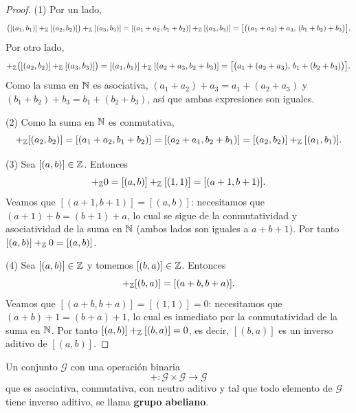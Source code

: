 \documentclass[12pt,a4paper]{book}
\begin{document}
    \begin{proof}
        (1) Por un lado,
        \begin{equation*}
            \big([(a_{1},b_{1})]+_{\mathbb{Z}}[(a_{2},b_{2})]\big)+_{\mathbb{Z}}[(a_{3},b_{3})] = [(a_{1}+a_{2},b_{1}+b_{2})]+_{\mathbb{Z}}[(a_{3},b_{3})] = \big[\big((a_{1}+a_{2})+a_{3},\,(b_{1}+b_{2})+b_{3}\big)\big].
        \end{equation*}
        Por otro lado,
        \begin{equation*}
            [(a_{1},b_{1})]+_{\Z}\big([(a_{2},b_{2})]+_{\Z}[(a_{3},b_{3})]\big) = [(a_{1},b_{1})]+_{\Z}[(a_{2}+a_{3},b_{2}+b_{3})] = \big[\big(a_{1}+(a_{2}+a_{3}),\,b_{1}+(b_{2}+b_{3})\big)\big].
        \end{equation*}
        Como la suma en $\mathbb{N}$ es asociativa, $(a_{1}+a_{2})+a_{3}=a_{1}+(a_{2}+a_{3})$ y $(b_{1}+b_{2})+b_{3}=b_{1}+(b_{2}+b_{3})$, así que ambas expresiones son iguales.

        (2) Como la suma en $\mathbb{N}$ es conmutativa,
        \begin{equation*}
            [(a_{1},b_{1})]+_{\Z}[(a_{2},b_{2})] = [(a_{1}+a_{2},b_{1}+b_{2})] = [(a_{2}+a_{1},b_{2}+b_{1})] = [(a_{2},b_{2})]+_{\Z}[(a_{1},b_{1})].
        \end{equation*}

        (3) Sea $[(a,b)]\in\mathbb{Z}$. Entonces
        \begin{equation*}
            [(a,b)]+_{\Z}0 = [(a,b)]+_{\Z}[(1,1)] = [(a+1,b+1)].
        \end{equation*}
        Veamos que $[(a+1,b+1)]=[(a,b)]$: necesitamos que $(a+1)+b=(b+1)+a$, lo cual se sigue de la conmutatividad y asociatividad de la suma en $\mathbb{N}$ (ambos lados son iguales a $a+b+1$). Por tanto $[(a,b)]+_{\mathbb{Z}}0=[(a,b)]$.

        (4) Sea $[(a,b)]\in\mathbb{Z}$ y tomemos $[(b,a)]\in\mathbb{Z}$. Entonces
        \begin{equation*}
            [(a,b)]+_{\Z}[(b,a)] = [(a+b,b+a)].
        \end{equation*}
        Veamos que $[(a+b,b+a)]=[(1,1)]=0$: necesitamos que $(a+b)+1=(b+a)+1$, lo cual es inmediato por la conmutatividad de la suma en $\mathbb{N}$. Por tanto $[(a,b)]+_{\mathbb{Z}}[(b,a)]=0$, es decir, $[(b,a)]$ es un inverso aditivo de $[(a,b)]$.
    \end{proof}

    \begin{definicion}
        \label{def:grupo-abeliano}
        Un conjunto $\mathcal{G}$ con una operación binaria
        \begin{equation*}
            +\colon\mathcal{G}\times\mathcal{G}\to\mathcal{G}
        \end{equation*}
        que es asociativa, conmutativa, con neutro aditivo y tal que todo elemento de $\mathcal{G}$ tiene inverso aditivo, se llama \textbf{grupo abeliano}.
    \end{definicion}
\end{document}
